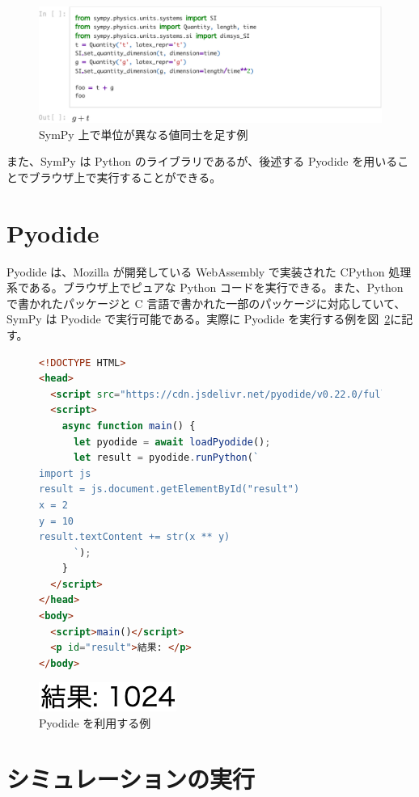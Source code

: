 \begin{figure}[t]
\centering
\includegraphics[width=\linewidth]{work/sympy_unit_example-crop.pdf}
\caption{SymPy 上で単位が異なる値同士を足す例} \label{sympy_unit_example}
\end{figure}

また、SymPy は Python のライブラリであるが、後述する Pyodide を用いることでブラウザ上で実行することができる。

\section{Pyodide}
Pyodide は、Mozilla が開発している WebAssembly で実装された CPython 処理系である。ブラウザ上でピュアな Python コードを実行できる。また、Python で書かれたパッケージと C 言語で書かれた一部のパッケージに対応していて、SymPy は Pyodide で実行可能である。実際に Pyodide を実行する例を図~\ref{pyodide_example}に記す。

\begin{figure}[h]
\centering
\begin{lstlisting}[language=HTML]
<!DOCTYPE HTML>
<head>
  <script src="https://cdn.jsdelivr.net/pyodide/v0.22.0/full/pyodide.js"></script>
  <script>
    async function main() {
      let pyodide = await loadPyodide();
      let result = pyodide.runPython(`
import js
result = js.document.getElementById("result")
x = 2
y = 10
result.textContent += str(x ** y)
      `);
    }
  </script>
</head>
<body>
  <script>main()</script>
  <p id="result">結果: </p>
</body>
\end{lstlisting}
\includegraphics*{work/pyodide_example.png}
\caption{Pyodide を利用する例} \label{pyodide_example}
\end{figure}

\section{シミュレーションの実行}

